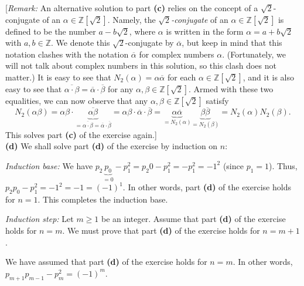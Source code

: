 \documentclass[paper=a4, fontsize=12pt]{scrartcl}%
\theoremstyle{plainsl}
\theoremstyle{definition}
\theoremstyle{remark}
\begin{document}
[\textit{Remark:} An alternative solution to part \textbf{(c)} relies on the
concept of a $\sqrt{2}$-conjugate of an $\alpha\in\mathbb{Z}\left[  \sqrt
{2}\right]  $. Namely, the $\sqrt{2}$\textit{-conjugate} of an $\alpha
\in\mathbb{Z}\left[  \sqrt{2}\right]  $ is defined to be the number
$a-b\sqrt{2}$, where $\alpha$ is written in the form $\alpha=a+b\sqrt{2}$ with
$a,b\in\mathbb{Z}$. We denote this $\sqrt{2}$-conjugate by $\overline{\alpha}%
$, but keep in mind that this notation clashes with the notation
$\overline{\alpha}$ for complex numbers $\alpha$. (Fortunately, we will not
talk about complex numbers in this solution, so this clash does not matter.)
It is easy to see that $N_{2}\left(  \alpha\right)  =\alpha\overline{\alpha}$
for each $\alpha\in\mathbb{Z}\left[  \sqrt{2}\right]  $, and it is also easy
to see that $\overline{\alpha\cdot\beta}=\overline{\alpha}\cdot\overline
{\beta}$ for any $\alpha,\beta\in\mathbb{Z}\left[  \sqrt{2}\right]  $. Armed
with these two equalities, we can now observe that any $\alpha,\beta
\in\mathbb{Z}\left[  \sqrt{2}\right]  $ satisfy%
\[
N_{2}\left(  \alpha\beta\right)  =\alpha\beta\cdot\underbrace{\overline
{\alpha\beta}}_{=\overline{\alpha\cdot\beta}=\overline{\alpha}\cdot
\overline{\beta}}=\alpha\beta\cdot\overline{\alpha}\cdot\overline{\beta
}=\underbrace{\alpha\overline{\alpha}}_{=N_{2}\left(  \alpha\right)
}\underbrace{\beta\overline{\beta}}_{=N_{2}\left(  \beta\right)  }%
=N_{2}\left(  \alpha\right)  N_{2}\left(  \beta\right)  .
\]
\newline This solves part \textbf{(c)} of the exercise again.]\\[0.4cm]

\textbf{(d)} We shall solve part \textbf{(d)} of the exercise by induction on
$n$:

\textit{Induction base:} We have $p_{2}\underbrace{p_{0}}_{=0}-p_{1}^{2}%
=p_{2}0-p_{1}^{2}=-p_{1}^{2}=-1^{2}$ (since $p_{1}=1$). Thus, $p_{2}%
p_{0}-p_{1}^{2}=-1^{2}=-1=\left(  -1\right)  ^{1}$. In other words, part
\textbf{(d)} of the exercise holds for $n=1$. This completes the induction base.

\textit{Induction step:} Let $m\geq1$ be an integer. Assume that part
\textbf{(d)} of the exercise holds for $n=m$. We must prove that part
\textbf{(d)} of the exercise holds for $n=m+1$.

We have assumed that part \textbf{(d)} of the exercise holds for $n=m$. In
other words, $p_{m+1}p_{m-1}-p_{m}^{2}=\left(  -1\right)  ^{m}$.
\end{document}
